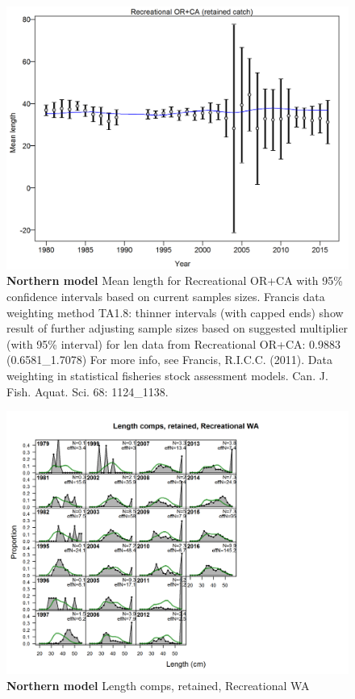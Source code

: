 \documentclass[12pt,]{article}
\begin{document}
\begin{figure}[htbp]
\centering
\includegraphics{./tex2pdf.8516/c4e7e4087d0b7b1bacb601a42f3d2d1558133e0f.png}
\caption{\textbf{Northern model} Mean length for Recreational OR+CA with
95\% confidence intervals based on current samples sizes. Francis data
weighting method TA1.8: thinner intervals (with capped ends) show result
of further adjusting sample sizes based on suggested multiplier (with
95\% interval) for len data from Recreational OR+CA: 0.9883
(0.6581\_1.7078) For more info, see Francis, R.I.C.C. (2011). Data
weighting in statistical fisheries stock assessment models. Can. J.
Fish. Aquat. Sci. 68: 1124\_1138.
\label{fig:mod1_17_comp_lenfit_data_weighting_TA1.8_Recreational OR+CA}}
\end{figure}

\begin{figure}[htbp]
\centering
\includegraphics{./r4ss/plots_mod1/comp_lenfit_flt4mkt2.png}
\caption{\textbf{Northern model} Length comps, retained, Recreational WA
\label{fig:mod1_18_comp_lenfit_flt4mkt2}}
\end{figure}
\end{document}
